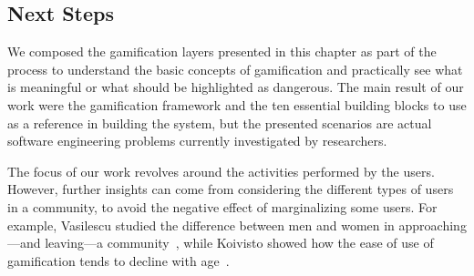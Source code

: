 %
%

\subsection{Next Steps}

We composed the gamification layers presented in this chapter as part of the process to understand the basic concepts of gamification and practically see what is meaningful or what should be highlighted as dangerous.
The main result of our work were the gamification framework and the ten essential building blocks to use as a reference in building the system, but the presented scenarios are actual software engineering problems currently investigated by researchers.

The focus of our work revolves around the activities performed by the users.
However, further insights can come from considering the different types of users in a community, to avoid the negative effect of marginalizing some users.
For example, Vasilescu \etal studied the difference between men and women in approaching---and leaving---a community~\cite{vasi2012}, while Koivisto \etal showed how the ease of use of gamification tends to decline with age~\cite{koiv2014}.


